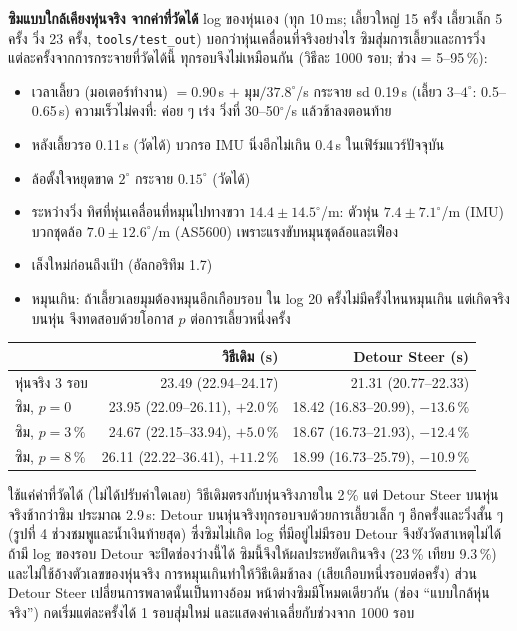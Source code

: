 \documentclass[11pt,a4paper]{article}
\begin{document}
{\smallskip
\noindent\textbf{ซิมแบบใกล้เคียงหุ่นจริง จากค่าที่วัดได้} log ของหุ่นเอง (ทุก 10\,ms; เลี้ยวใหญ่ 15 ครั้ง
เลี้ยวเล็ก 5 ครั้ง วิ่ง 23 ครั้ง, \texttt{tools/test\_out}) บอกว่าหุ่นเคลื่อนที่จริงอย่างไร ซิมสุ่มการเลี้ยวและการวิ่ง
แต่ละครั้งจากการกระจายที่วัดได้นี้ ทุกรอบจึงไม่เหมือนกัน (วิธีละ 1000 รอบ; ช่วง = 5--95\,\%):
\begin{itemize}\setlength\itemsep{0pt}
\item เวลาเลี้ยว (มอเตอร์ทำงาน) $= 0.90$\,s $+$ มุม$/37.8^\circ$/s กระจาย sd 0.19\,s (เลี้ยว $3$--$4^\circ$: 0.5--0.65\,s)
  ความเร็วไม่คงที่: ค่อย ๆ เร่ง วิ่งที่ 30--50$^\circ$/s แล้วช้าลงตอนท้าย
\item หลังเลี้ยวรอ 0.11\,s (วัดได้) บวกรอ IMU นิ่งอีกไม่เกิน 0.4\,s ในเฟิร์มแวร์ปัจจุบัน
\item ล้อตั้งใจหยุดขาด $2^\circ$ กระจาย $0.15^\circ$ (วัดได้)
\item ระหว่างวิ่ง ทิศที่หุ่นเคลื่อนที่หมุนไปทางขวา $14.4 \pm 14.5^\circ$/m: ตัวหุ่น $7.4 \pm 7.1^\circ$/m (IMU)
  บวกชุดล้อ $7.0 \pm 12.6^\circ$/m (AS5600) เพราะแรงขับหมุนชุดล้อและเฟือง
\item เล็งใหม่ก่อนถึงเป้า (อัลกอริทึม 1.7)
\item หมุนเกิน: ถ้าเลี้ยวเลยมุมต้องหมุนอีกเกือบรอบ ใน log 20 ครั้งไม่มีครั้งไหนหมุนเกิน แต่เกิดจริงบนหุ่น
  จึงทดสอบด้วยโอกาส $p$ ต่อการเลี้ยวหนึ่งครั้ง
\end{itemize}
\begin{center}
\begin{tabular}{lrr}
\toprule
 & วิธีเดิม (s) & Detour Steer (s) \\
\midrule
หุ่นจริง 3 รอบ           & 23.49 (22.94--24.17) & 21.31 (20.77--22.33) \\
ซิม, $p = 0$            & 23.95 (22.09--26.11), $+2.0\,\%$ & 18.42 (16.83--20.99), $-13.6\,\%$ \\
ซิม, $p = 3\,\%$        & 24.67 (22.15--33.94), $+5.0\,\%$ & 18.67 (16.73--21.93), $-12.4\,\%$ \\
ซิม, $p = 8\,\%$        & 26.11 (22.22--36.41), $+11.2\,\%$ & 18.99 (16.73--25.79), $-10.9\,\%$ \\
\bottomrule
\end{tabular}
\end{center}
ใช้แค่ค่าที่วัดได้ (ไม่ได้ปรับค่าใดเลย) วิธีเดิมตรงกับหุ่นจริงภายใน 2\,\% แต่ Detour Steer บนหุ่นจริงช้ากว่าซิม
ประมาณ 2.9\,s: Detour บนหุ่นจริงทุกรอบจบด้วยการเลี้ยวเล็ก ๆ อีกครั้งและวิ่งสั้น ๆ (รูปที่ 4 ช่วงชมพูและน้ำเงินท้ายสุด)
ซึ่งซิมไม่เกิด log ที่มีอยู่ไม่มีรอบ Detour จึงยังวัดสาเหตุไม่ได้ ถ้ามี log ของรอบ Detour จะปิดช่องว่างนี้ได้
ซิมนี้จึงให้ผลประหยัดเกินจริง (23\,\% เทียบ 9.3\,\%) และไม่ใช้อ้างตัวเลขของหุ่นจริง
การหมุนเกินทำให้วิธีเดิมช้าลง (เสียเกือบหนึ่งรอบต่อครั้ง) ส่วน Detour Steer เปลี่ยนการพลาดนั้นเป็นทางอ้อม
หน้าต่างซิมมีโหมดเดียวกัน (ช่อง ``แบบใกล้หุ่นจริง'') กดเริ่มแต่ละครั้งได้ 1 รอบสุ่มใหม่ และแสดงค่าเฉลี่ยกับช่วงจาก 1000 รอบ

}
\end{document}
